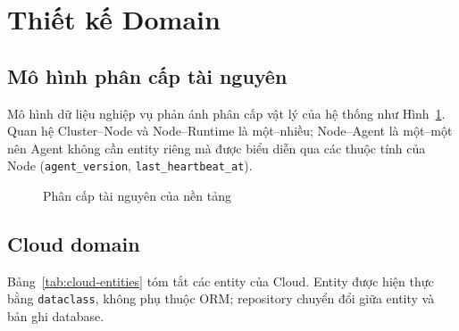\section{Thiết kế Domain}

\subsection{Mô hình phân cấp tài nguyên}

Mô hình dữ liệu nghiệp vụ phản ánh phân cấp vật lý của hệ thống như
Hình~\ref{fig:resource-hierarchy}. Quan hệ Cluster--Node và Node--Runtime là
một--nhiều; Node--Agent là một--một nên Agent không cần entity riêng mà được
biểu diễn qua các thuộc tính của Node (\texttt{agent\_version},
\texttt{last\_heartbeat\_at}).

\begin{figure}[H]
\centering
{}
\caption{Phân cấp tài nguyên của nền tảng}
\label{fig:resource-hierarchy}
\end{figure}

\subsection{Cloud domain}

Bảng~\ref{tab:cloud-entities} tóm tắt các entity của Cloud. Entity được hiện thực
bằng \texttt{dataclass}, không phụ thuộc ORM; repository chuyển đổi giữa entity và
bản ghi database.


